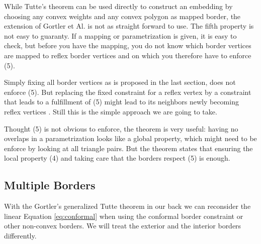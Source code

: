 While Tutte's theorem can be used directly to construct an embedding by choosing any convex weights and any convex polygon as mapped border, the extension of Gortler et Al. is not as straight forward to use. The fifth property is not easy to guaranty. If a mapping or parametrization is given, it is easy to check, but before you have the mapping, you do not know which border vertices are mapped to reflex border vertices and on which you therefore have to enforce (5). 

Simply fixing all border vertices as is proposed in the last section, does not enforce (5). But replacing the fixed constraint for a reflex vertex by a constraint that leads to a fulfillment of (5) might lead to its neighbors newly becoming reflex vertices . Still this is the simple approach we are going to take.

Thought (5) is not obvious to enforce, the theorem is very useful: having no overlaps in a parametrization looks like a global property, which might need to be enforce by looking at all triangle pairs. But the theorem states that ensuring the local property (4) and taking care that the borders respect (5) is enough.


\subsection{Multiple Borders}
With the Gortler's generalized Tutte theorem in our back we can reconsider the linear Equation \ref{eq:conformal} when using the conformal border constraint or other non-convex borders. We will treat the exterior and the interior borders differently. 
